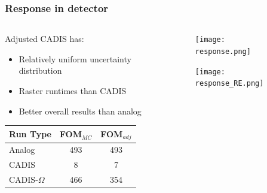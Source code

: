 \documentclass[handout]{beamer}
\renewcommand{\(}{\begin{columns}}
\renewcommand{\)}{\end{columns}}
\newcommand{\<}[1]{\begin{column}{#1}}
\renewcommand{\>}{\end{column}}
\begin{document}
%
\begin{frame}[fragile]
  \frametitle{Response in detector}
  
\begin{columns}
  \begin{column}{0.45\textwidth}
  Adjusted CADIS has:
  \begin{itemize}
    \item Relatively uniform uncertainty distribution
    \item Raster runtimes than CADIS
    \item Better overall results than analog
  \end{itemize}
  \begin{tabular}{|l|c c|}
  \hline
      Run Type & FOM$_{MC}$ & FOM$_{adj}$ \\  
      \hline
      Analog & 493 & 493 \\
      CADIS  & 8   &   7 \\
      CADIS-$\Omega$ & 466 & 354 \\
      \hline
  \end{tabular}
  \end{column}
  \begin{column}{0.55\textwidth}
  	\begin{figure}
  	\begin{center}
  		\texttt{[image: response.png]}
	\end{center}
  	\end{figure}
  	  \begin{figure}
  	\begin{center}
  		\texttt{[image: response\_RE.png]}
	\end{center}
  	\end{figure}
  \end{column}
\end{columns}
	
\end{frame}
\end{document}
